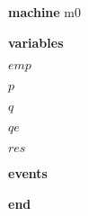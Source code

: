 \begin{block}
  \item   \textbf{machine} m0
  \item   \textbf{variables}
  \begin{block}
    \item   $emp$
    \item   $p$
    \item   $q$
    \item   $qe$
    \item   $res$
  \end{block}
  \item   
  \item   \textbf{events}
  \begin{block}
    \item   
    \item   
    \item   
    \item   
    \item   
    \item   
  \end{block}
  \item   \textbf{end} \\
\end{block}
